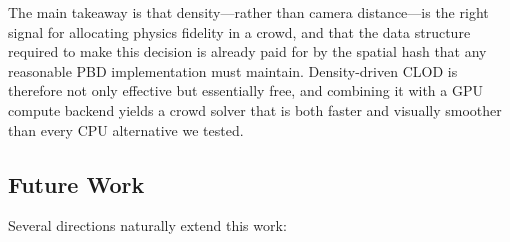 The main takeaway is that density---rather than camera distance---is
the right signal for allocating physics fidelity in a crowd, and that
the data structure required to make this decision is already paid for
by the spatial hash that any reasonable PBD implementation must
maintain.  Density-driven CLOD is therefore not only effective but
essentially free, and combining it with a GPU compute backend yields a
crowd solver that is both faster and visually smoother than every CPU
alternative we tested.

\subsection{Future Work}
\label{sec:future}

Several directions naturally extend this work:

